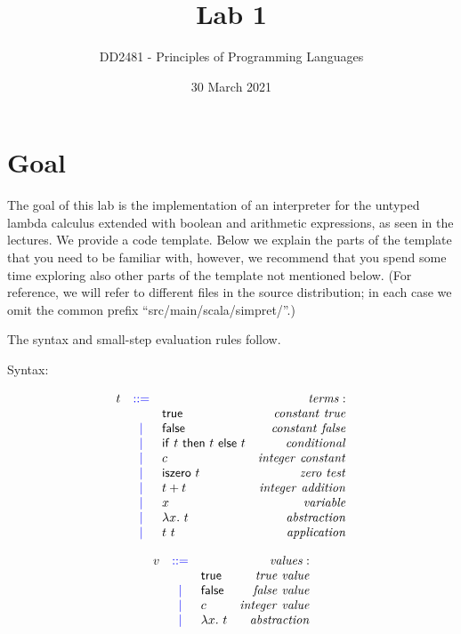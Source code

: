 \documentclass[12pt, a4paper, twoside]{article}
\title{Lab 1}
\author{DD2481 - Principles of Programming Languages}
\date{30 March 2021}
\begin{document}
\maketitle

\section{Goal}

The goal of this lab is the implementation of an interpreter for the
untyped lambda calculus extended with boolean and arithmetic
expressions, as seen in the lectures. We provide a code
template. Below we explain the parts of the template that you need to
be familiar with, however, we recommend that you spend some time
exploring also other parts of the template not mentioned below. (For
reference, we will refer to different files in the source
distribution; in each case we omit the common prefix
``src/main/scala/simpret/''.)

The syntax and small-step evaluation rules follow.

Syntax:

\[\begin{array}{rclr}
t &\mathrel{\color{blue}{::=}}& ~ & \mathit{terms:} \\
~ &~      & \mathsf{true}            & \mathit{constant~true} \\
~ &\mathrel{\color{blue}{|}}& \mathsf{false}           & \mathit{constant~false} \\
~ &\mathrel{\color{blue}{|}}& \mathsf{if}\ {t}\ \mathsf{then}\ {t}\ \mathsf{else}\ {t} & \mathit{conditional} \\
~ &\mathrel{\color{blue}{|}}& c                & \mathit{integer~constant} \\
~ &\mathrel{\color{blue}{|}}& \mathsf{iszero}~t        & \mathit{zero~test} \\
~ &\mathrel{\color{blue}{|}}& t + t            & \mathit{integer~addition} \\
~ &\mathrel{\color{blue}{|}}& x                & \mathit{variable} \\
~ &\mathrel{\color{blue}{|}}& \lambda x.~t     & \mathit{abstraction} \\
~ &\mathrel{\color{blue}{|}}& t~t              & \mathit{application} \\
\end{array}\]

\[\begin{array}{rclr}
v &\mathrel{\color{blue}{::=}}& ~ & \mathit{values:} \\
~ &~      & \mathsf{true}            & \mathit{true~value} \\
~ &\mathrel{\color{blue}{|}}& \mathsf{false}           & \mathit{false~value} \\
~ &\mathrel{\color{blue}{|}}& c                & \mathit{integer~value} \\
~ &\mathrel{\color{blue}{|}}& \lambda x.~t     & \mathit{abstraction} \\
\end{array}\]
\end{document}
